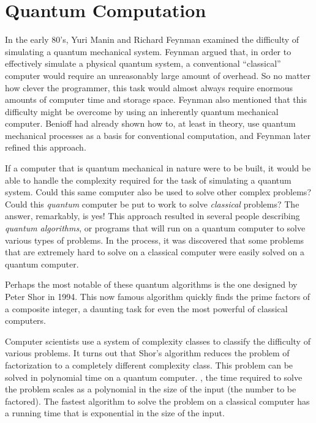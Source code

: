 
\chapter{Quantum Computation}
\label{chap:quantumComputation}
%

In the early 80's, 
Yuri Manin\cite{Manin:80} and Richard Feynman\cite{Feynman:82} examined 
the difficulty of simulating a quantum mechanical system.  
Feynman argued that, in order to effectively simulate a physical quantum 
system, a conventional ``classical'' computer would require an unreasonably 
large amount of overhead.  So no matter how clever the programmer, this
task would almost always require enormous amounts of computer time and storage
space.  Feynman also mentioned that this difficulty might be overcome
by using an inherently quantum mechanical computer.  
Benioff\cite{Benioff:80} had already shown how to, at least in theory, 
use quantum mechanical processes as a basis for conventional computation,
and Feynman\cite{Feynman:85} later refined this approach.

If a computer that is quantum mechanical in nature were to be built,
it would be able to handle the complexity required for the task of simulating
a quantum system.  Could this same computer also be used to solve other complex
problems?  Could this {\sl quantum} computer be put to work to solve 
{\sl classical} problems?  The answer, remarkably,  is yes!
This approach resulted in several 
people\cite{Deutsch:85a,Deutsch:85b,Deutsch/Jozsa:92,Bernstein/Vazirani:97,
Simon:97,Shor:94,Grover:96a}
describing \emph{quantum algorithms}, or programs that will run on a quantum
computer to solve various types of problems.
In the process, it was discovered that some problems that are extremely hard
to solve on a classical computer were easily solved on a quantum computer.

Perhaps the most notable of these quantum algorithms is the one designed by 
Peter Shor\cite{Shor:94} in 1994.  This now famous algorithm quickly finds the 
prime factors of a composite integer, a daunting task for even the most
powerful of classical computers.  

Computer scientists use a system of
complexity classes to classify the difficulty of various problems.
It turns out that Shor's algorithm reduces the problem of factorization
to a completely different complexity class.  This problem can be solved
in polynomial time on a quantum computer.  \ie, the time required to solve
the problem scales as a polynomial in the size of the input (the number to
be factored).  The fastest algorithm to solve the problem on a classical
computer%
has a running time that is exponential in the size of the input.

